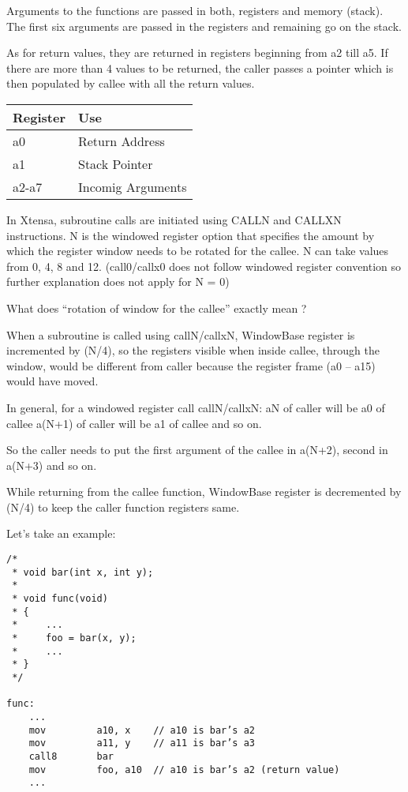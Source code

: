 Arguments to the functions are passed in both, registers and memory (stack). The first six arguments are passed in the registers and remaining go on the stack.

As for return values, they are returned in registers beginning from a2 till a5. If there are more than 4 values to be returned, the caller passes a pointer which is then populated by callee with all the return values.

\begin{longtable}{|p{5cm}|p{5cm}|}
    \hline
    Register & Use \\
    \hline
    a0 & Return Address\\ \hline
    a1 & Stack Pointer\\ \hline
    a2-a7 & Incomig Arguments\\ \hline
\end{longtable}

In Xtensa, subroutine calls are initiated using CALLN and CALLXN instructions. N is the windowed register option that specifies the amount by which the register window needs to be rotated for the callee. N can take values from 0, 4, 8 and 12. (call0/callx0 does not follow windowed register convention so further explanation does not apply for N = 0)

What does “rotation of window for the callee” exactly mean ?

When a subroutine is called using callN/callxN, WindowBase register is incremented by (N/4), so the registers visible when inside callee, through the window, would be different from caller because the register frame (a0 -- a15) would have moved.

In general, for a windowed register call callN/callxN:
aN of caller will be a0 of callee
a(N+1) of caller will be a1 of callee and so on.

So the caller needs to put the first argument of the callee in a(N+2), second in a(N+3) and so on.

While returning from the callee function, WindowBase register is decremented by (N/4) to keep the caller function registers same.

Let’s take an example:

\begin{verbatim}
/*
 * void bar(int x, int y);
 *
 * void func(void)
 * {
 *     ...
 *     foo = bar(x, y);
 *     ...
 * }
 */

func:
    ...
    mov         a10, x    // a10 is bar’s a2
    mov         a11, y    // a11 is bar’s a3
    call8       bar
    mov         foo, a10  // a10 is bar’s a2 (return value)
    ...
\end{verbatim}

